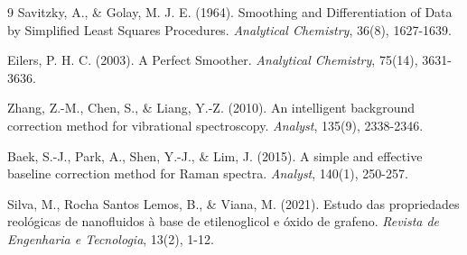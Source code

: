 \documentclass[a4paper,11pt]{article}
\begin{document}
\begin{thebibliography}{9}
Savitzky, A., \& Golay, M. J. E. (1964). Smoothing and Differentiation of Data by Simplified Least Squares Procedures. \textit{Analytical Chemistry}, 36(8), 1627-1639.

Eilers, P. H. C. (2003). A Perfect Smoother. \textit{Analytical Chemistry}, 75(14), 3631-3636.

Zhang, Z.-M., Chen, S., \& Liang, Y.-Z. (2010). An intelligent background correction method for vibrational spectroscopy. \textit{Analyst}, 135(9), 2338-2346.

Baek, S.-J., Park, A., Shen, Y.-J., \& Lim, J. (2015). A simple and effective baseline correction method for Raman spectra. \textit{Analyst}, 140(1), 250-257.

Silva, M., Rocha Santos Lemos, B., \& Viana, M. (2021). Estudo das propriedades reológicas de nanofluidos à base de etilenoglicol e óxido de grafeno. \textit{Revista de Engenharia e Tecnologia}, 13(2), 1-12.
\end{thebibliography}
\end{document}
